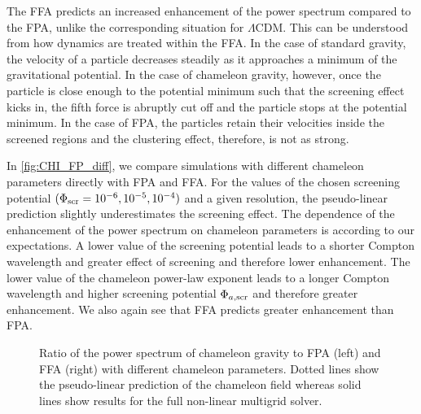 The FFA predicts an increased enhancement of the power spectrum compared to the FPA, unlike the corresponding situation for $\Lambda$CDM. This can be understood from how dynamics are treated within the FFA. In the case of standard gravity, the velocity of a particle decreases steadily as it approaches a minimum of the gravitational potential. In the case of chameleon gravity, however, once the particle is close enough to the potential minimum such that the screening effect kicks in, the fifth force is abruptly cut off and the particle stops at the potential minimum. In the case of FPA, the particles retain their velocities inside the screened regions and the clustering effect, therefore, is not as strong.

In \autoref{fig:CHI_FP_diff}, we compare simulations with different chameleon parameters directly with FPA and FFA. For the values of the chosen screening potential $(\Phi_{\text{\scriptsize scr}}=10^{-6}, 10^{-5}, 10^{-4})$ and a given resolution, the pseudo-linear prediction slightly underestimates the screening effect. The dependence of the enhancement of the power spectrum on chameleon parameters is according to our expectations. A lower value of the screening potential leads to a shorter Compton wavelength and greater effect of screening and therefore lower enhancement. The lower value of the chameleon power-law exponent leads to a longer Compton wavelength and higher screening potential $\Phi_{a,\text{\scriptsize scr}}$ and therefore greater enhancement. We also again see that FFA predicts greater enhancement than FPA.

\begin{figure*}[tb]
  \centering
  \chileft
	\begin{subfigure}{1.2\textwidth}
	\end{subfigure}
	\begin{subfigure}{0.5\textwidth}
	\end{subfigure}%
	\begin{subfigure}{0.5\textwidth}
	\end{subfigure}
  \caption{Ratio of the power spectrum of chameleon gravity to FPA (left) and FFA (right) with different chameleon parameters. Dotted lines show the pseudo-linear prediction of the chameleon field whereas solid lines show results for the full non-linear multigrid solver.}
  \label{fig:CHI_FP_diff}
\end{figure*}

